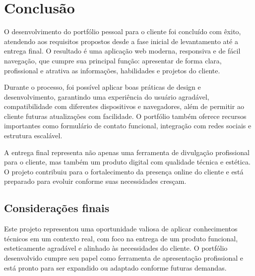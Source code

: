 \chapter{Conclusão}
\label{chap:conc}

O desenvolvimento do portfólio pessoal para o cliente foi concluído com êxito, atendendo aos requisitos propostos desde a fase inicial de levantamento até a entrega final. O resultado é uma aplicação web moderna, responsiva e de fácil navegação, que cumpre sua principal função: apresentar de forma clara, profissional e atrativa as informações, habilidades e projetos do cliente.

Durante o processo, foi possível aplicar boas práticas de design e desenvolvimento, garantindo uma experiência do usuário agradável, compatibilidade com diferentes dispositivos e navegadores, além de permitir ao cliente futuras atualizações com facilidade. O portfólio também oferece recursos importantes como formulário de contato funcional, integração com redes sociais e estrutura escalável.

A entrega final representa não apenas uma ferramenta de divulgação profissional para o cliente, mas também um produto digital com qualidade técnica e estética. O projeto contribuiu para o fortalecimento da presença online do cliente e está preparado para evoluir conforme suas necessidades cresçam.


\section{Considerações finais}
\label{sec:consid}

Este projeto representou uma oportunidade valiosa de aplicar conhecimentos técnicos em um contexto real, com foco na entrega de um produto funcional, esteticamente agradável e alinhado às necessidades do cliente. O portfólio desenvolvido cumpre seu papel como ferramenta de apresentação profissional e está pronto para ser expandido ou adaptado conforme futuras demandas.
